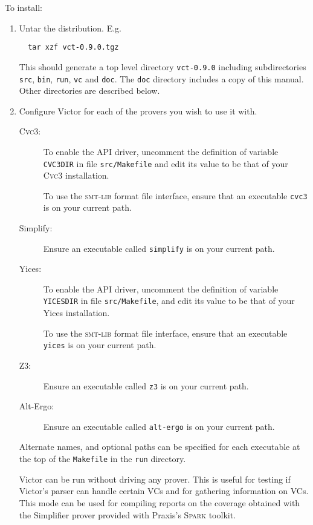 \documentclass[12pt,fleqn]{article}
\newcommand{\spark}{\textsc{Spark}}
\newcommand{\cvcthree}{\textsc{Cvc}3}
\newcommand{\zthree}{\textsc{Z}3}
\newcommand{\yices}{Yices}
\newcommand{\altergo}{Alt-Ergo}
\newcommand{\smtlib}{\textsc{smt-lib}}
\begin{document}
To install:
\begin{enumerate}
\item Untar the distribution.  E.g. 
\begin{verbatim}
  tar xzf vct-0.9.0.tgz
\end{verbatim}
  This should generate a top level directory
  \texttt{vct-0.9.0} including subdirectories 
    \texttt{src},
    \texttt{bin},
    \texttt{run},
    \texttt{vc}
   and \texttt{doc}.
   The \texttt{doc} directory includes a copy of this manual.
   Other directories are described below.
\item 
  Configure Victor for each of the provers you wish to use it with.
  \begin{description}

  \item[\cvcthree:] To enable the API driver, uncomment the definition
    of variable \texttt{CVC3DIR} in file \texttt{src/Makefile} and edit
    its value to be that of your \cvcthree{} installation.  
    
    To use the \smtlib{} format file interface, ensure that an
    executable \texttt{cvc3} is on your current path.

  \item[Simplify:] Ensure an executable called \texttt{simplify} is on your
    current path. 

  \item[\yices:] 
    To enable the API driver, uncomment the definition of variable
    \texttt{YICESDIR} in file \texttt{src/Makefile}, and edit its
    value to be that of your \yices{} installation.

    To use the \smtlib{} format file interface, ensure that an
    executable \texttt{yices} is on your current path.

  \item[\zthree:]  Ensure an executable called \texttt{z3} is on your
    current path.

  \item[\altergo:]  Ensure an executable called \texttt{alt-ergo} is on your
    current path.
  \end{description}
  Alternate names, and optional paths can be specified for each executable
  at the top of the \texttt{Makefile} in the \texttt{run} directory.

  Victor can be run without driving any prover.  This is useful for
  testing if Victor's parser can handle certain VCs and for gathering
  information on VCs.  This mode can be used for compiling reports on
  the coverage obtained with the Simplifier prover provided with
  Praxis's \spark{} toolkit.


\end{enumerate}
\end{document}
